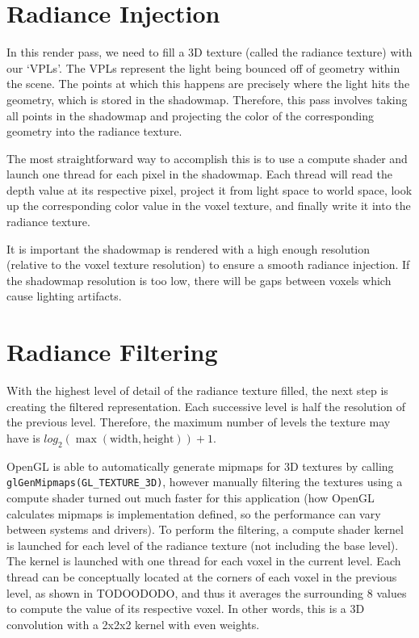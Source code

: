 \section{Radiance Injection}
In this render pass, we need to fill a 3D texture (called the radiance texture) with our `VPLs'. The VPLs represent the light being bounced off of geometry within the scene. The points at which this happens are precisely where the light hits the geometry, which is stored in the shadowmap. Therefore, this pass involves taking all points in the shadowmap and projecting the color of the corresponding geometry into the radiance texture.

The most straightforward way to accomplish this is to use a compute shader and launch one thread for each pixel in the shadowmap. Each thread will read the depth value at its respective pixel, project it from light space to world space, look up the corresponding color value in the voxel texture, and finally write it into the radiance texture.

It is important the shadowmap is rendered with a high enough resolution (relative to the voxel texture resolution) to ensure a smooth radiance injection. If the shadowmap resolution is too low, there will be gaps between voxels which cause lighting artifacts.


\section{Radiance Filtering}
With the highest level of detail of the radiance texture filled, the next step is creating the filtered representation. Each successive level is half the resolution of the previous level. Therefore, the maximum number of levels the texture may have is $log_2 (\max (\text{width}, \text{height})) + 1$.

OpenGL is able to automatically generate mipmaps for 3D textures by calling \verb#glGenMipmaps(GL_TEXTURE_3D)#, however manually filtering the textures using a compute shader turned out much faster for this application (how OpenGL calculates mipmaps is implementation defined, so the performance can vary between systems and drivers). To perform the filtering, a compute shader kernel is launched for each level of the radiance texture (not including the base level). The kernel is launched with one thread for each voxel in the current level. Each thread can be conceptually located at the corners of each voxel in the previous level, as shown in TODOODODO, and thus it averages the surrounding 8 values to compute the value of its respective voxel. In other words, this is a 3D convolution with a 2x2x2 kernel with even weights.

